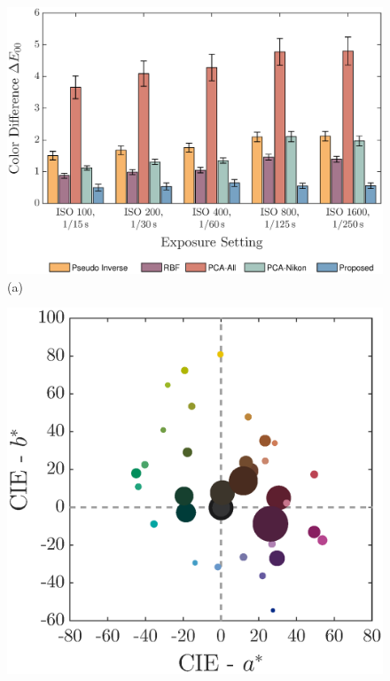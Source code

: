 \documentclass[9pt,twocolumn,twoside]{osajnl}
\providecommand{\DIFaddbeginFL}{} %
\providecommand{\DIFaddendFL}{} %
\providecommand{\DIFdelbeginFL}{} %
\providecommand{\DIFdelendFL}{} %
\begin{document}
	\begin{figure}[tbp]
		\centering
		\DIFdelbeginFL %
\DIFdelendFL \DIFaddbeginFL \begin{minipage}[b]{0.57\linewidth}
			\DIFaddendFL \centering
			\DIFdelbeginFL %
\DIFdelendFL \DIFaddbeginFL \includegraphics[width=\linewidth]{Fig13a}\DIFaddendFL \\
			(a)
		\end{minipage}%
		\DIFdelbeginFL %
\DIFdelendFL \DIFaddbeginFL \begin{minipage}[b]{0.43\linewidth}
			\DIFaddendFL \centering
			\DIFdelbeginFL %
\DIFdelendFL \DIFaddbeginFL \includegraphics[width=\linewidth]{Fig13b}\DIFaddendFL \\

\end{minipage}
\end{figure}
\end{document}
